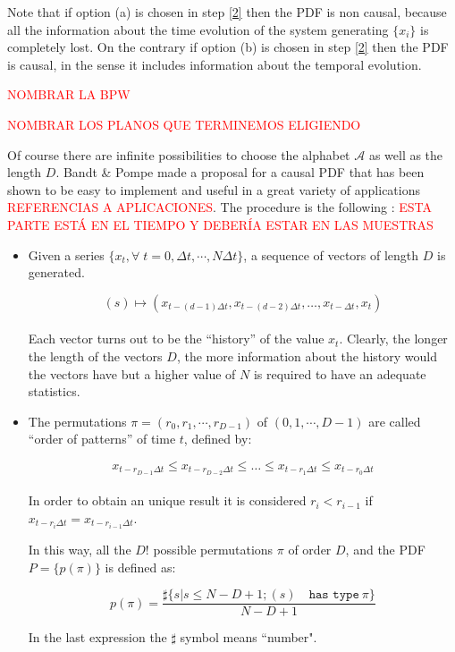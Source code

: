 Note that if option (a) is chosen in step \ref{2} then the PDF is non causal, because all the information about the time evolution of the system generating $\{x_i\}$ is completely lost.
On the contrary if option (b) is chosen in step \ref{2} then the PDF is causal, in the sense it includes information about the temporal evolution.

\textcolor{red}{NOMBRAR LA BPW}

\textcolor{red}{NOMBRAR LOS PLANOS QUE TERMINEMOS ELIGIENDO}

Of course there are infinite possibilities to choose the alphabet $\mathcal{A}$ as well as the length $D$.
Bandt \& Pompe made a proposal for a causal PDF that has been shown to be easy to implement and useful in a great variety of applications \textcolor{red}{REFERENCIAS A APLICACIONES}.
The procedure is the following \cite{Bandt2002,Keller2003,Keller2005}: \textcolor{red}{ESTA PARTE ESTÁ EN EL TIEMPO Y DEBERÍA ESTAR EN LAS MUESTRAS}

\begin{itemize}
	\item Given a series $\{x_t, \forall \;  t=0, \Delta t, \cdots,N\Delta t \}$, a sequence of vectors of length $D$ is generated.
	
	\begin{equation}
	(s)\longmapsto\left(x_{t-(d-1)\Delta t},x_{t-(d-2)\Delta t},\dots,x_{t-\Delta t},x_{t}\right) 
	\label{eq:vectores}
	\end{equation}
	\\
	Each vector turns out to be the ``history'' of the value $x_t$. Clearly, the longer the length of the vectors $D$, the more information about the history would the vectors have but a higher value of $N$ is required to have an adequate statistics. 
	\\
	\item The permutations $\pi=(r_0, r_1, \cdots, r_{D-1})$ of $(0, 1, \cdots, D-1)$ are called ``order of patterns'' of time $t$, defined by:
	
	\begin{equation}
	\label{eq:permuta}
	x_{t-r_{D-1}\Delta t}\le x_{t-r_{D-2}\Delta t}\le\dots\le x_{t-r_{1}\Delta t}\le x_{t-r_0\Delta t}
	\end{equation}
	\\
	In order to obtain an unique result it is considered $r_i<r_{i-1}$ if $x_{t-r_{i}\Delta t}=x_{t-r_{i-1}\Delta t}$.
	
	In this way, all the $D!$ possible permutations $\pi$ of order $D$, and the PDF $P=\{p(\pi)\}$ is defined as:
	
	\begin{equation}
	\label{eq:frequ}
	p(\pi)=\frac{\sharp \{s|s\leq N-D+1; (s) \quad \texttt{has type}~\pi\}}{N-D+1}
	\end{equation}
	
	In the last expression the $\sharp$ symbol means ``number".
\end{itemize}


